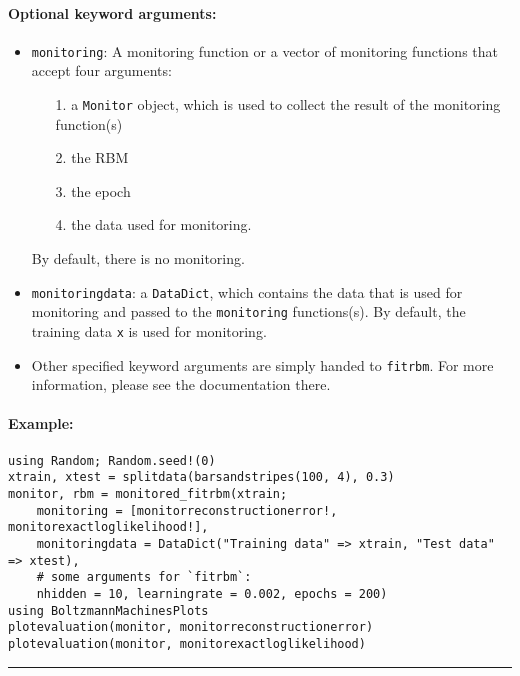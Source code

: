 \paragraph*{Optional keyword arguments:}
\begin{itemize}
\item \texttt{monitoring}: A monitoring function or a vector of monitoring functions that accept four arguments:

\begin{itemize}
\item[1. ] a \texttt{Monitor} object, which is used to collect the result of the monitoring function(s)


\item[2. ] the RBM


\item[3. ] the epoch


\item[4. ] the data used for monitoring.

\end{itemize}
By default, there is no monitoring.


\item \texttt{monitoringdata}: a \texttt{DataDict}, which contains the data that is used for  monitoring and passed to the \texttt{monitoring} functions(s).  By default, the training data \texttt{x} is used for monitoring.


\item Other specified keyword arguments are simply handed to \texttt{fitrbm}. For more information, please see the documentation there.

\end{itemize}
\paragraph*{Example:}
\begin{verbatim}
using Random; Random.seed!(0)
xtrain, xtest = splitdata(barsandstripes(100, 4), 0.3)
monitor, rbm = monitored_fitrbm(xtrain;
    monitoring = [monitorreconstructionerror!, monitorexactloglikelihood!],
    monitoringdata = DataDict("Training data" => xtrain, "Test data" => xtest),
    # some arguments for `fitrbm`:
    nhidden = 10, learningrate = 0.002, epochs = 200)
using BoltzmannMachinesPlots
plotevaluation(monitor, monitorreconstructionerror)
plotevaluation(monitor, monitorexactloglikelihood)
\end{verbatim}
\noindent\rule{\textwidth}{1pt}
